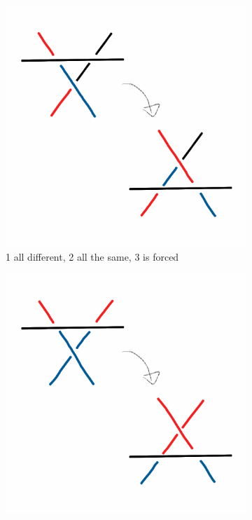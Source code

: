 \documentclass[12pt,letterpaper]{article}
\theoremstyle{definition}
\begin{document}
\begin{figure}[h!]
    \centering
    \begin{subfigure}{.3\textwidth}
        \centering
        \includegraphics[width=\textwidth]{meeting10pics/1d2s.png}
        \caption{1 all different, 2 all the same, 3 is forced}
    \end{subfigure}
    \quad
    \begin{subfigure}{.3\textwidth}
        \centering
        \includegraphics[width=\textwidth]{meeting10pics/1d2d3s.png}

\end{subfigure}
\end{figure}
\end{document}
